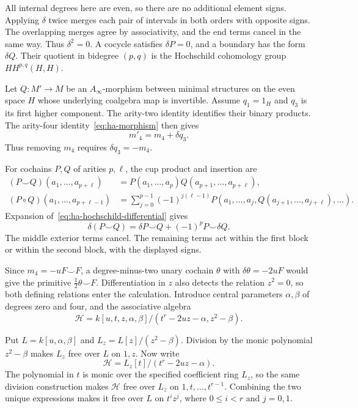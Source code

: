 All internal degrees here are even, so there are no additional element
signs. Applying $\delta$ twice merges each pair of intervals in both
orders with opposite signs. The overlapping merges agree by
associativity, and the end terms cancel in the same way.
Thus $\delta^2=0$. A cocycle satisfies $\delta P=0$, and a boundary
has the form $\delta Q$. Their quotient in bidegree $(p,q)$ is
the Hochschild cohomology group $HH^{p,q}(H,H)$.

Let $Q:M'\to M$ be an $A_\infty$-morphism between minimal
structures on the even space $H$ whose underlying coalgebra map
is invertible. Assume $q_1=1_H$ and $q_3$ is its first higher component.
The arity-two identity identifies their binary products.
The arity-four identity~\eqref{eq:ha-morphism} then gives
\[
 m'_4=m_4+\delta q_3.
\]
Thus removing $m_4$ requires $\delta q_3=-m_4$.

For cochains $P,Q$ of arities $p,\ell$, the cup product and insertion are
\[
 \begin{split}
 (P\smile Q)(a_1,\ldots,a_{p+\ell})
 &=P(a_1,\ldots,a_p)Q(a_{p+1},\ldots,a_{p+\ell}),\\
 (P\circ Q)(a_1,\ldots,a_{p+\ell-1})
 &=\sum_{j=0}^{p-1}(-1)^{j(\ell-1)}
 P(a_1,\ldots,a_j,Q(a_{j+1},\ldots,a_{j+\ell}),\ldots).
 \end{split}
\]
Expansion of~\eqref{eq:ha-hochschild-differential} gives
\[
 \delta(P\smile Q)=\delta P\smile Q+(-1)^pP\smile\delta Q.
\]
The middle exterior terms cancel. The remaining terms act within
the first block or within the second block, with the displayed signs.

Since $m_4=-uF\smile F$, a degree-minus-two unary cochain
$\theta$ with $\delta\theta=-2uF$ would give the primitive
$\tfrac12\theta\smile F$.
Differentiation in $z$ also detects the relation $z^2=0$, so both
defining relations enter the calculation.
Introduce central parameters $\alpha,\beta$ of degrees zero and
four, and the associative algebra
\[
 \mathcal H=k[u,t,z,\alpha,\beta]/
           (t^r-2uz-\alpha,z^2-\beta).
\]

Put $L=k[u,\alpha,\beta]$ and
$L_z=L[z]/(z^2-\beta)$. Division by the monic polynomial
$z^2-\beta$ makes $L_z$ free over $L$ on $1,z$.
Now write
\[
 \mathcal H=L_z[t]/(t^r-2uz-\alpha).
\]
The polynomial in $t$ is monic over the specified coefficient ring
$L_z$, so the same division construction makes $\mathcal H$ free
over $L_z$ on $1,t,\ldots,t^{r-1}$. Combining the two unique
expressions makes it free over $L$ on $t^iz^j$, where
$0\leq i<r$ and $j=0,1$.

